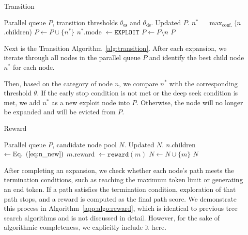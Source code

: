 \begin{algorithm}[ht]
    \caption{Transition}
\label{alg:transition}
\begin{algorithmic}[1]
\REQUIRE Parallel queue $P$, transition thresholds $\theta_\mathrm{es}$ and $\theta_\mathrm{ds}$. 
\ENSURE Updated $P$. 
    \STATE $n^*=\max_\mathrm{conf.}$($n$.children)
        \STATE $P \gets P\cup \{n^*\}$
        \STATE $n^*$.mode $\gets \mathtt{EXPLOIT}$ 
    \ENDIF
    \STATE $P \gets P \setminus n$
\ENDFOR
\RETURN $P$
\end{algorithmic}
\end{algorithm}

Next is the Transition Algorithm~\ref{alg:transition}. After each expansion, we iterate through all nodes in the parallel queue $P$ and identify the best child node  $n^*$ for each node.

Then, based on the category of node $n$, we compare $n^*$ with the corresponding threshold  $\theta$. If the early stop condition is not met or the deep seek condition is met, we add  $n^*$ as a new exploit node into $P$. Otherwise, the node will no longer be expanded and will be evicted from $P$.

\begin{algorithm}[ht]
    \caption{Reward}
\label{app:algo:reward}
\begin{algorithmic}[1]
\REQUIRE Parallel queue $P$, candidate node pool $N$. 
\ENSURE Updated $N$. 
        \STATE $n$.children $\gets \text{Eq. (\ref{eq:n_new})}$ 
                \STATE $m$.reward $\gets \mathtt{reward}(m)$
            \ELSE
                \STATE $N \gets N \cup \{m\}$
            \ENDIF
        \ENDFOR
    \ENDFOR
\RETURN $N$
\end{algorithmic}
\end{algorithm}

After completing an expansion, we check whether each node’s path meets the termination conditions, such as reaching the maximum token limit or generating an end token. 
If a path satisfies the termination condition, exploration of that path stops, and a reward is computed as the final path score. We demonstrate this process in Algorithm~\ref{app:algo:reward}, which is identical to previous tree search algorithms and is not discussed in detail. However, for the sake of algorithmic completeness, we explicitly include it here.

